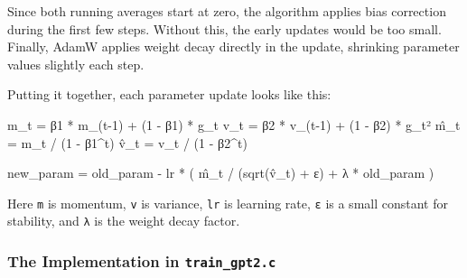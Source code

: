 \documentclass[
  letterpaper,
  DIV=11,
  numbers=noendperiod]{scrreprt}
\newenvironment{Shaded}{\begin{snugshade}}{\end{snugshade}}
\newcommand{\NormalTok}[1]{\textcolor[rgb]{0.00,0.23,0.31}{#1}}
\begin{document}
Since both running averages start at zero, the algorithm applies bias
correction during the first few steps. Without this, the early updates
would be too small. Finally, AdamW applies weight decay directly in the
update, shrinking parameter values slightly each step.

Putting it together, each parameter update looks like this:

\begin{Shaded}
\begin{Highlighting}[]
\NormalTok{m\_t = β1 * m\_(t{-}1) + (1 {-} β1) * g\_t}
\NormalTok{v\_t = β2 * v\_(t{-}1) + (1 {-} β2) * g\_t²}
\NormalTok{m̂\_t = m\_t / (1 {-} β1\^{}t)}
\NormalTok{v̂\_t = v\_t / (1 {-} β2\^{}t)}

\NormalTok{new\_param = old\_param {-} lr * ( m̂\_t / (sqrt(v̂\_t) + ε) + λ * old\_param )}
\end{Highlighting}
\end{Shaded}

Here \texttt{m} is momentum, \texttt{v} is variance, \texttt{lr} is
learning rate, \texttt{ε} is a small constant for stability, and
\texttt{λ} is the weight decay factor.

\subsubsection{\texorpdfstring{The Implementation in
\texttt{train\_gpt2.c}}{The Implementation in train\_gpt2.c}}\label{the-implementation-in-train_gpt2.c}
\end{document}

